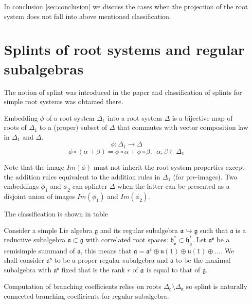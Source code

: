 \documentclass{article}
\newcommand{\gf}{\mathfrak{g}}
\newcommand{\af}{\mathfrak{a}}
\begin{document}
In conclusion \ref{sec:conclusion} we discuss the cases when the projection of the root system does
not fall into above mentioned classification.

\section{Splints of root systems and regular subalgebras}
\label{sec:splints-root-systems}
The notion of splint was introduced in the paper \cite{richter2008splints} and classification of
splints for simple root systems was obtained there. 

Embedding $\phi$ of a root system $\Delta_1$ into a root system
$\Delta$ is a bijective map of roots of $\Delta_{1}$ to a (proper)
subset of $\Delta$ that commutes with vector composition law in
$\Delta_{1}$ and $\Delta$.
\begin{equation*}
\phi:\Delta_1 \longrightarrow \Delta
\end{equation*}
\begin{equation*}
\phi \circ (\alpha + \beta) =\phi \circ \alpha + \phi \circ \beta,
\,\,\, \alpha,\beta \in \Delta_1
\end{equation*}

Note that the image $Im(\phi)$ must not inherit the root system
properties except the addition rules equivalent to the addition
rules in $\Delta_{1}$ (for pre-images). Two embeddings $\phi_1$ and $\phi_2$  
can splinter $\Delta$  when the latter can be presented 
as a disjoint union of images $Im(\phi_1)$ and $Im(\phi_2)$.   

The classification is shown in table

Consider a simple Lie algebra $\mathfrak{g}$ and its regular subalgebra $%
\mathfrak{a}\hookrightarrow \mathfrak{g}$ such that $\mathfrak{a}$
is a
reductive subalgebra $\mathfrak{a \subset g}$ with correlated root spaces: $%
\mathfrak{h}_{\mathfrak{a}}^{\ast }\subset \mathfrak{h}_{\mathfrak{g }%
}^{\ast }$. Let $\mathfrak{a}^{\mathfrak{s}}$ be a semisimple summand of
$\mathfrak{a}$,
this means that $\mathfrak{a}=\mathfrak{a}^{\mathfrak{s}} \oplus \mathfrak{u}(1)\oplus %
\mathfrak{u}(1)\oplus \dots$. We shall consider $\mathfrak{a}^{\mathfrak{s}}$
to be a proper regular subalgebra and $\mathfrak{a}$ to be the
maximal subalgebra with $\mathfrak{a}^{\mathfrak{s}}$ fixed that is the rank
$r$ of $\frak{a}$ is equal to that of $\mathfrak{g}$.

Computation of branching coefficients relies on roots $\Delta_{\gf}\setminus \Delta_{\af}$
\cite{2010arXiv1007.0318L} so splint  is naturally connected branching coefficients for regular
subalgebra.
\end{document}
